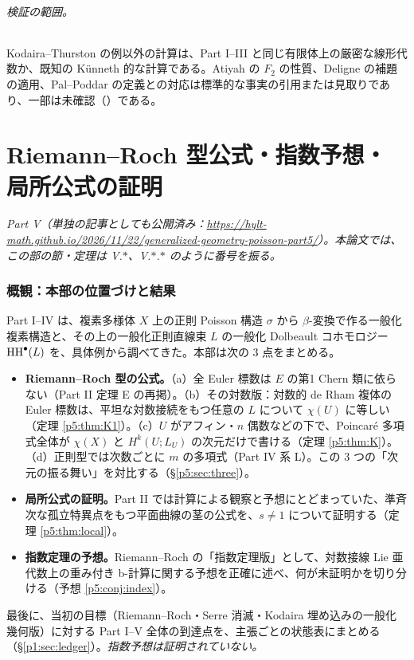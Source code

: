 \paragraph{検証の範囲。}Kodaira--Thurston の例以外の計算は、Part I--III と同じ有限体上の厳密な線形代数か、既知の Künneth 的な計算である。Atiyah の $F_2$ の性質、Deligne の補題の適用、Pal--Poddar の定義との対応は標準的な事実の引用または見取りであり、一部は未確認（\tQ）である。



\clearpage
\part{Riemann--Roch 型公式・指数予想・局所公式の証明}
\setcounter{section}{0}
\noindent\textit{Part V（単独の記事としても公開済み：\url{https://hylt-math.github.io/2026/11/22/generalized-geometry-poisson-part5/}）。本論文では、この部の節・定理は V.$\ast$、V.$\ast$.$\ast$ のように番号を振る。}\par
\section{概観：本部の位置づけと結果}
Part I--IV は、複素多様体 $X$ 上の正則 Poisson 構造 $\sigma$ から $\beta$-変換で作る一般化複素構造と、その上の一般化正則直線束 $L$ の一般化 Dolbeault コホモロジー $\mathrm{HH}^\bullet(L)$ を、具体例から調べてきた。本部は次の 3 点をまとめる。

\begin{itemize}
\item \textbf{Riemann--Roch 型の公式。}（a）全 Euler 標数は $E$ の第1 Chern 類に依らない（Part II 定理 E の再掲）。（b）その対数版：対数的 de Rham 複体の Euler 標数は、平坦な対数接続をもつ任意の $L$ について $\chi(U)$ に等しい（定理 \ref{p5:thm:K1}）\tP。（c）$U$ がアフィン・$n$ 偶数などの下で、Poincaré 多項式全体が $\chi(X)$ と $H^k(U;L_U)$ の次元だけで書ける（定理 \ref{p5:thm:K}）\tP\tV。（d）正則型では次数ごとに $m$ の多項式（Part IV 系 L）。この 3 つの「次元の振る舞い」を対比する（\S\ref{p5:sec:three}）。
\item \textbf{局所公式の証明。}Part II では計算による観察と予想にとどまっていた、準斉次な孤立特異点をもつ平面曲線の茎の公式を、$s\ne1$ について証明する（定理 \ref{p5:thm:local}）\tP。
\item \textbf{指数定理の予想。}Riemann--Roch の「指数定理版」として、対数接線 Lie 亜代数上の重み付き b-計算に関する予想を正確に述べ、何が未証明かを切り分ける（予想 \ref{p5:conj:index}）\tK。
\end{itemize}
最後に、当初の目標（Riemann--Roch・Serre 消滅・Kodaira 埋め込みの一般化幾何版）に対する Part I--V 全体の到達点を、主張ごとの状態表にまとめる（\S\ref{p1:sec:ledger}）。\emph{指数予想は証明されていない。}

